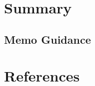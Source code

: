 \documentclass[letterpaper,11pt]{texMemo}
\begin{document}
\maketitle             %
\thispagestyle{plain}  %
\section{Summary}
\subsection{Memo Guidance}  %
\section{References}
\end{document}

